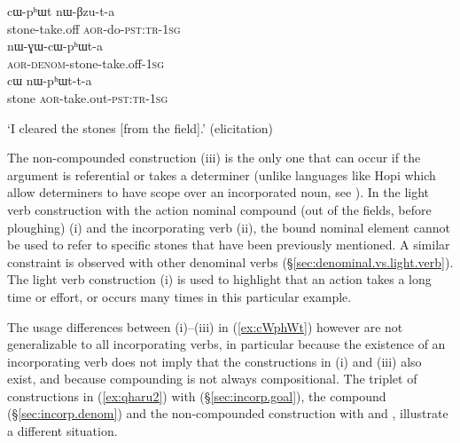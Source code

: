 \begin{exe}
\ex \label{ex:cWphWt}
\begin{xlist}[(ii)]
\gll  cɯ-pʰɯt nɯ-βzu-t-a  \\
  stone-take.off \textsc{aor}-do-\textsc{pst}:\textsc{tr}-\textsc{1sg} \\
\gll nɯ-ɣɯ-cɯ-pʰɯt-a \\
\textsc{aor}-\textsc{denom}-stone-take.off-\textsc{1sg} \\
\gll cɯ nɯ-pʰɯt-t-a  \\
  stone \textsc{aor}-take.out-\textsc{pst}:\textsc{tr}-\textsc{1sg} \\
\end{xlist}
\glt `I cleared the stones [from the field].' (elicitation)
\end{exe}   

The non-compounded construction (iii) is the only one that can occur if the argument is referential or takes a determiner (unlike languages like Hopi which allow determiners to have scope over an incorporated noun, see \citealt{hill.kc03hopi, haugen08incorp}). In the light verb construction with the action nominal compound  (out of the fields, before ploughing) (i) and the incorporating verb  (ii), the bound nominal element  cannot be used to refer to specific stones that have been previously mentioned. A similar constraint is observed with other denominal verbs (§\ref{sec:denominal.vs.light.verb}). The light verb construction (i) is used to highlight that an action takes a long time or effort, or occurs many times in this particular example. 

The usage differences between (i)--(iii) in (\ref{ex:cWphWt}) however are not generalizable to all incorporating verbs, in particular because the existence of an incorporating verb does not imply that the constructions in (i) and (iii) also exist, and because compounding is not always compositional. The triplet of constructions in (\ref{ex:qharu2}) with  (§\ref{sec:incorp.goal}), the compound  (§\ref{sec:incorp.denom}) and the non-compounded construction with   and , illustrate a different situation.

